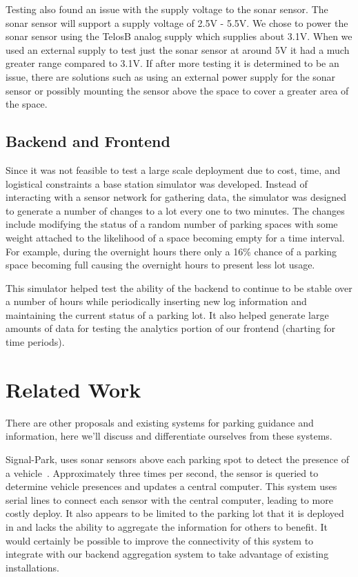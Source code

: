 \documentclass{acm_proc}
\begin{document}
Testing also found an issue with the supply voltage to the sonar sensor.
The sonar sensor will support a supply voltage of 2.5V - 5.5V.
We chose to power the sonar sensor using the TelosB analog supply which
supplies about 3.1V.
When we used an external supply to test just the sonar sensor at around 5V
it had a much greater range compared to 3.1V.
If after more testing it is determined to be an issue, there are solutions
such as using an external power supply for the sonar sensor or possibly
mounting the sensor above the space to cover a greater area of the space. 

\subsection{Backend and Frontend}

Since it was not feasible to test a large scale deployment due to cost,
time, and logistical constraints a base station simulator was developed.
Instead of interacting with a sensor network for gathering data, the
simulator was designed to generate a number of changes to a lot every one
to two minutes.
The  changes include modifying the status of a random number of parking
spaces with some weight attached to the likelihood of a space becoming empty
for a time interval.
For example, during the overnight hours there only a 16\% chance of a
parking space becoming full causing the overnight hours to present less lot
usage.

This simulator helped test the ability of the backend to continue to be
stable over a number of hours while periodically inserting new log
information and maintaining the current status of a parking lot.
It also helped generate large amounts of data for testing the analytics
portion of our frontend (charting for time periods).

\section{Related Work}\label{sec:related}

There are other proposals and existing systems for parking guidance and
information, here we'll discuss and differentiate ourselves from these
systems.

Signal-Park, uses sonar sensors above each parking spot to detect the
presence of a vehicle~\cite{pgi:signal-park}.
Approximately three times per second, the sensor is queried to determine
vehicle presences and updates a central computer.
This system uses serial lines to connect each sensor with the central
computer, leading to more costly deploy.
It also appears to be limited to the parking lot that it is deployed in and
lacks the ability to aggregate the information for others to benefit.
It would certainly be possible to improve the connectivity of this system
to integrate with our backend aggregation system to take advantage of
existing installations.
\end{document}
